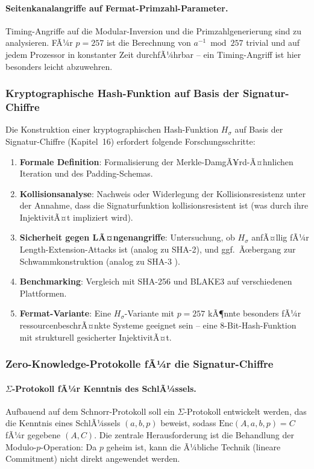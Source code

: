 ﻿\documentclass[a4paper,12pt]{scrreprt}
\theoremstyle{definition}
\begin{document}
\paragraph{Seitenkanalangriffe auf Fermat-Primzahl-Parameter.}
Timing-Angriffe \cite{Koc96} auf die Modular-Inversion und die Primzahlgenerierung sind zu analysieren. FÃ¼r $p = 257$ ist die Berechnung von $a^{-1} \bmod 257$ trivial und auf jedem Prozessor in konstanter Zeit durchfÃ¼hrbar -- ein Timing-Angriff ist hier besonders leicht abzuwehren.

\subsubsection{Kryptographische Hash-Funktion auf Basis der Signatur-Chiffre}

Die Konstruktion einer kryptographischen Hash-Funktion $H_\sigma$ auf Basis der Signatur-Chiffre (Kapitel~16) erfordert folgende Forschungsschritte:

\begin{enumerate}
    \item \textbf{Formale Definition}: Formalisierung der Merkle-DamgÃ¥rd-Ã¤hnlichen Iteration und des Padding-Schemas.
    \item \textbf{Kollisionsanalyse}: Nachweis oder Widerlegung der Kollisionsresistenz unter der Annahme, dass die Signaturfunktion kollisionsresistent ist (was durch ihre InjektivitÃ¤t impliziert wird).
    \item \textbf{Sicherheit gegen LÃ¤ngenangriffe}: Untersuchung, ob $H_\sigma$ anfÃ¤llig fÃ¼r Length-Extension-Attacks ist (analog zu SHA-2), und ggf.\ Ãœbergang zur Schwammkonstruktion (analog zu SHA-3 \cite{BDPA13}).
    \item \textbf{Benchmarking}: Vergleich mit SHA-256 und BLAKE3 auf verschiedenen Plattformen.
    \item \textbf{Fermat-Variante}: Eine $H_\sigma$-Variante mit $p = 257$ kÃ¶nnte besonders fÃ¼r ressourcenbeschrÃ¤nkte Systeme geeignet sein -- eine 8-Bit-Hash-Funktion mit strukturell gesicherter InjektivitÃ¤t.
\end{enumerate}

\subsubsection{Zero-Knowledge-Protokolle fÃ¼r die Signatur-Chiffre}

\paragraph{$\Sigma$-Protokoll fÃ¼r Kenntnis des SchlÃ¼ssels.}
Aufbauend auf dem Schnorr-Protokoll soll ein $\Sigma$-Protokoll entwickelt werden, das die Kenntnis eines SchlÃ¼ssels $(a,b,p)$ beweist, sodass $\mathrm{Enc}(A,a,b,p) = C$ fÃ¼r gegebene $(A,C)$. Die zentrale Herausforderung ist die Behandlung der Modulo-$p$-Operation: Da $p$ geheim ist, kann die Ã¼bliche Technik (lineare Commitment) nicht direkt angewendet werden.
\end{document}
